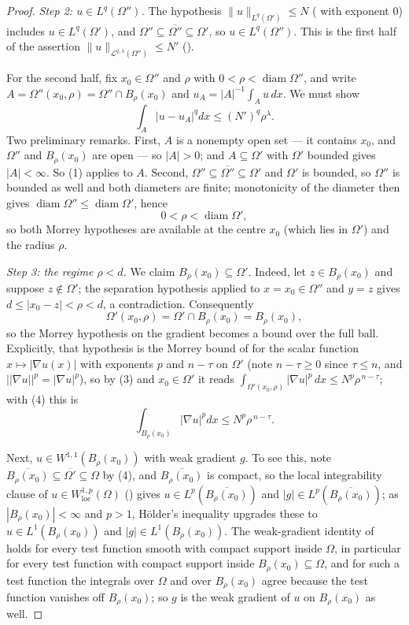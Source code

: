 \begin{proof}
\emph{Step 2: $u\in L^{q}(\Omega'')$.}  The hypothesis
$\|u\|_{L^{q}(\Omega')}\le N$ ( with exponent $0$)
includes $u\in L^{q}(\Omega')$, and $\Omega''\subseteq\overline{\Omega''}
\subseteq\Omega'$, so $u\in L^{q}(\Omega'')$.  This is the first half of the
assertion $\|u\|_{\mathcal L^{q,\lambda}(\Omega'')}\le N'$
().

For the second half, fix $x_0\in\Omega''$ and $\rho$ with
$0<\rho<\operatorname{diam}\Omega''$, and write $A=\Omega''(x_0,\rho)=
\Omega''\cap B_\rho(x_0)$ and $u_A=|A|^{-1}\int_Au\,dx$.  We must show
\[
\int_A|u-u_A|^{q}dx\le (N')^{q}\rho^{\lambda}.
\tag{2}
\]
Two preliminary remarks.  First, $A$ is a nonempty open set --- it contains
$x_0$, and $\Omega''$ and $B_\rho(x_0)$ are open --- so $|A|>0$; and
$A\subseteq\Omega'$ with $\Omega'$ bounded gives $|A|<\infty$.  So (1) applies to
$A$.  Second, $\Omega''\subseteq\overline{\Omega''}\subseteq\Omega'$ and $\Omega'$
is bounded, so $\Omega''$ is bounded as well and both diameters are finite;
monotonicity of the diameter then gives
$\operatorname{diam}\Omega''\le\operatorname{diam}\Omega'$, hence
\[
0<\rho<\operatorname{diam}\Omega' ,
\tag{3}
\]
so both Morrey hypotheses are available at the centre $x_0$ (which lies in
$\Omega'$) and the radius $\rho$.

\emph{Step 3: the regime $\rho<d$.}  We claim $B_\rho(x_0)\subseteq\Omega'$.
Indeed, let $z\in B_\rho(x_0)$ and suppose $z\notin\Omega'$; the separation
hypothesis applied to $x=x_0\in\Omega''$ and $y=z$ gives $d\le|x_0-z|<\rho<d$, a
contradiction.  Consequently
\[
\Omega'(x_0,\rho)=\Omega'\cap B_\rho(x_0)=B_\rho(x_0),
\tag{4}
\]
so the Morrey hypothesis on the gradient becomes a bound over the full ball.
Explicitly, that hypothesis is the Morrey bound of  for
the scalar function $x\mapsto|\nabla u(x)|$ with exponents $p$ and $n-\tau$ on
$\Omega'$ (note $n-\tau\ge0$ since $\tau\le n$, and
$\bigl||\nabla u|\bigr|^p=|\nabla u|^p$), so by (3) and $x_0\in\Omega'$ it reads
$\int_{\Omega'(x_0,\rho)}|\nabla u|^p\,dx\le N^p\rho^{\,n-\tau}$; with (4) this
is
\[
\int_{B_\rho(x_0)}|\nabla u|^{p}dx\le N^{p}\rho^{\,n-\tau}.
\tag{5}
\]

Next, $u\in W^{1,1}(B_\rho(x_0))$ with weak gradient $g$.  To see this, note
$\overline{B_\rho(x_0)}\subseteq\overline{\Omega'}\subseteq\Omega$ by (4), and
$\overline{B_\rho(x_0)}$ is compact, so the local integrability clause of
$u\in W^{1,p}_{\mathrm{loc}}(\Omega)$ () gives
$u\in L^{p}(\overline{B_\rho(x_0)})$ and $|g|\in L^{p}(\overline{B_\rho(x_0)})$;
as $|B_\rho(x_0)|<\infty$ and $p>1$, H\"older's inequality upgrades these to
$u\in L^{1}(B_\rho(x_0))$ and $|g|\in L^{1}(B_\rho(x_0))$.  The weak-gradient
identity of  holds for every test function smooth with
compact support inside $\Omega$, in particular for every test function with
compact support inside $B_\rho(x_0)\subseteq\Omega$, and for such a test function
the integrals over $\Omega$ and over $B_\rho(x_0)$ agree because the test
function vanishes off $B_\rho(x_0)$; so $g$ is the weak gradient of $u$ on
$B_\rho(x_0)$ as well.


\end{proof}
